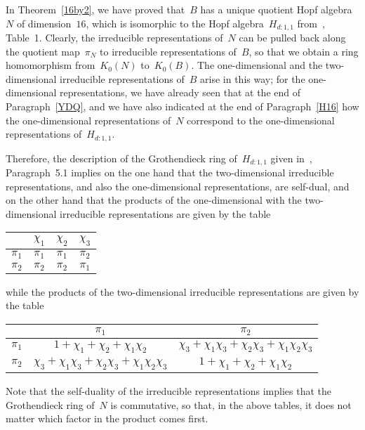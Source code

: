 \documentclass{article}
\numberwithin{equation}{section}
\theoremstyle{definition}
\theoremstyle{break}
\newcommand{\1}{{(1)}}
\newcommand{\2}{{(2)}}
\newcommand{\3}{{(3)}}
\begin{document}
In Theorem~\ref{16by2}, we have proved that~$B$ has a unique quotient Hopf algebra~$N$ of dimension~$16$, which is isomorphic to the Hopf algebra~$H_{d:1,1}$ from~\cite{Ka}, Table~1. Clearly, the irreducible representations of~$N$ can be pulled back along the quotient map~$\pi_N$ to irreducible representations of~$B$, so that we obtain a ring homomorphism from~$K_{0}(N)$ to~$K_{0}(B)$. The one-dimensional and the two-dimensional irreducible representations of~$B$ arise in this way; for the one-dimensional representations, we have already seen that at the end of Paragraph~\ref{YDQ}, and we have also indicated at the end of Paragraph~\ref{H16} how the one-dimensional representations of~$N$ correspond to the one-dimensional representations of~$H_{d:1,1}$.

Therefore, the description of the Grothendieck ring of~$H_{d:1,1}$ given in~\cite{Ka}, Paragraph~5.1 implies on the one hand that the two-dimensional irreducible representations, and also the one-dimensional representations, are self-dual, and on the other hand that the products of the one-dimensional with the two-dimensional irreducible representations are given by the table
\begin{center}
\renewcommand\arraystretch{1.5}
\begin{tabular}{|c|c|c|c|} \hline
& $\chi_1$ & $\chi_2$ & $\chi_3$  \\ \hline
$\pi_1$ & $\pi_1$ & $\pi_1$ & $\pi_2$ \\ \hline
$\pi_2$ & $\pi_2$ & $\pi_2$ & $\pi_1$ \\ \hline
\end{tabular}
\end{center}
while the products of the two-dimensional irreducible representations are given by the table
\begin{center}
\renewcommand\arraystretch{1.5}
\begin{tabular}{|c|c|c|} \hline
& $\pi_1$ & $\pi_2$ \\ \hline
$\pi_1$ & $1 + \chi_1 + \chi_2 + \chi_1 \chi_2$
& $\chi_3 + \chi_1 \chi_3 + \chi_2 \chi_3 + \chi_1 \chi_2 \chi_3$ \\ \hline
$\pi_2$ & $\chi_3 + \chi_1 \chi_3 + \chi_2 \chi_3 + \chi_1 \chi_2 \chi_3$
& $1 + \chi_1 + \chi_2 + \chi_1 \chi_2$ \\ \hline
\end{tabular}
\end{center}
Note that the self-duality of the irreducible representations implies that the Grothendieck ring of~$N$ is commutative, so that, in the above tables, it does not matter which factor in the product comes first.
\end{document}
